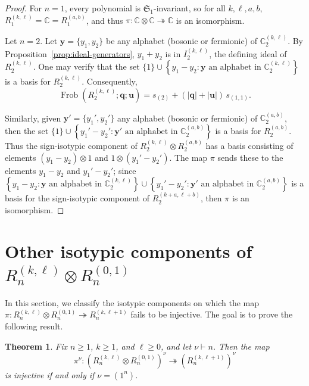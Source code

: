 \documentclass[11pt, reqno]{amsart}
\newtheorem{theorem}{Theorem}[section]
\theoremstyle{definition}
\theoremstyle{remark}
\numberwithin{equation}{section}
\newcommand{\0}{\emptyset}
\newcommand{\C}{\mathbb{C}}
\renewcommand{\S}{\mathfrak{S}}
\DeclareMathOperator{\Frob}{Frob}
\begin{document}
\begin{proof}
    For $n=1$, every polynomial is $\S_1$-invariant, so for all $k,\ell,a,b$, $R_1^{(k,\ell)} = \C = R_1^{(a,b)}$, and thus $\pi:\C \otimes \C \twoheadrightarrow \C$ is an isomorphism.

    Let $n=2$. 
    Let $\bm{y} = {\{y_1,y_2\}}$ be any alphabet (bosonic or fermionic) of $\C_2^{(k,\ell)}$. 
    By Proposition~\ref{prop:ideal-generators}, $y_1 + y_2$ is in $I_2^{(k,\ell)}$, the defining ideal of $R_2^{(k,\ell)}$.
    One may verify that the set $\{1\} \cup \left\{y_1-y_2 : \bm{y} \text{ an alphabet in } 
    \C_2^{(k,\ell)}\right\}$ is a basis for $R_2^{(k,\ell)}$.
    Consequently,
    \begin{equation*}
        \Frob\left(R_2^{(k,\ell)}; \mathbf{q}; \mathbf{u}\right) = 
        s_{(2)} + \left(|\mathbf{q}| + |\mathbf{u}|\right)\, s_{(1,1)}.
    \end{equation*}

    Similarly, given $\bm{y}' = {\{y_1',y_2'\}}$ any alphabet (bosonic or fermionic) of 
    $\C_2^{(a,b)}$, then the set 
    $\{1\} \cup \left\{y_1'-y_2' : \bm{y}' \text{ an alphabet in } \C_2^{(a,b)}\right\}$ 
    is a basis for $R_2^{(a,b)}$. 
    Thus the sign-isotypic component of $R_2^{(k,\ell)} \otimes R_2^{(a,b)}$ has a basis consisting of elements $(y_1-y_2) \otimes 1$ and $1 \otimes (y_1'-y_2')$.  
    The map $\pi$ sends these to the elements $y_1-y_2$ and $y_1'-y_2'$; 
    since $\left\{y_1-y_2 : \bm{y} \text{ an alphabet in } \C_2^{(k,\ell)}\right\} \cup 
    \left\{y_1'-y_2' : \bm{y}' \text{ an alphabet in } \C_2^{(a,b)}\right\}$ 
    is a basis for the sign-isotypic component of $R_2^{(k+a,\ell+b)}$, 
    then $\pi$ is an isomorphism. 
\end{proof}

\section{Other isotypic components of \texorpdfstring{$R_n^{(k,\ell)} \otimes R_n^{(0,1)}$}{Rn(k,l)xRn(0,1)}}\label{sec:mezzoswaddle}

In this section, we classify the isotypic components on which the map $\pi: R_n^{(k,\ell)} \otimes R_n^{(0,1)} \twoheadrightarrow R_n^{(k,\ell+1)}$ fails to be injective.
The goal is to prove the following result.
\begin{theorem}\label{thm:mezzo-swaddle}
    Fix $n \geq 1$, $k \geq 1$, and $\ell \geq 0$, and let $\nu \vdash n$.
    Then the map
    \begin{equation*}
        \pi^\nu: \left(R_n^{(k,\ell)} \otimes R_n^{(0,1)}\right)^\nu \twoheadrightarrow \left(R_n^{(k,\ell+1)}\right)^\nu
    \end{equation*}
    is injective if and only if $\nu = (1^n)$.
\end{theorem}
\end{document}
